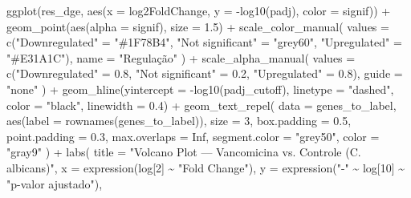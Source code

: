 \documentclass[
  letterpaper,
  DIV=11,
  numbers=noendperiod]{scrreprt}
\newenvironment{Shaded}{\begin{snugshade}}{\end{snugshade}}
\newcommand{\AttributeTok}[1]{\textcolor[rgb]{0.40,0.45,0.13}{#1}}
\newcommand{\ConstantTok}[1]{\textcolor[rgb]{0.56,0.35,0.01}{#1}}
\newcommand{\DecValTok}[1]{\textcolor[rgb]{0.68,0.00,0.00}{#1}}
\newcommand{\FloatTok}[1]{\textcolor[rgb]{0.68,0.00,0.00}{#1}}
\newcommand{\FunctionTok}[1]{\textcolor[rgb]{0.28,0.35,0.67}{#1}}
\newcommand{\NormalTok}[1]{\textcolor[rgb]{0.00,0.23,0.31}{#1}}
\newcommand{\OtherTok}[1]{\textcolor[rgb]{0.00,0.23,0.31}{#1}}
\newcommand{\SpecialCharTok}[1]{\textcolor[rgb]{0.37,0.37,0.37}{#1}}
\newcommand{\StringTok}[1]{\textcolor[rgb]{0.13,0.47,0.30}{#1}}
\begin{document}
\begin{Shaded}
\begin{Highlighting}[]
\FunctionTok{ggplot}\NormalTok{(res\_dge, }\FunctionTok{aes}\NormalTok{(}\AttributeTok{x =}\NormalTok{ log2FoldChange, }\AttributeTok{y =} \SpecialCharTok{{-}}\FunctionTok{log10}\NormalTok{(padj), }\AttributeTok{color =}\NormalTok{ signif)) }\SpecialCharTok{+}
  \FunctionTok{geom\_point}\NormalTok{(}\FunctionTok{aes}\NormalTok{(}\AttributeTok{alpha =}\NormalTok{ signif), }\AttributeTok{size =} \FloatTok{1.5}\NormalTok{) }\SpecialCharTok{+}
  \FunctionTok{scale\_color\_manual}\NormalTok{(}
    \AttributeTok{values =} \FunctionTok{c}\NormalTok{(}\StringTok{"Downregulated"} \OtherTok{=} \StringTok{"\#1F78B4"}\NormalTok{,}
               \StringTok{"Not significant"} \OtherTok{=} \StringTok{"grey60"}\NormalTok{,}
               \StringTok{"Upregulated"} \OtherTok{=} \StringTok{"\#E31A1C"}\NormalTok{),}
    \AttributeTok{name =} \StringTok{"Regulação"}
\NormalTok{  ) }\SpecialCharTok{+}
  \FunctionTok{scale\_alpha\_manual}\NormalTok{(}
    \AttributeTok{values =} \FunctionTok{c}\NormalTok{(}\StringTok{"Downregulated"} \OtherTok{=} \FloatTok{0.8}\NormalTok{,}
               \StringTok{"Not significant"} \OtherTok{=} \FloatTok{0.2}\NormalTok{,}
               \StringTok{"Upregulated"} \OtherTok{=} \FloatTok{0.8}\NormalTok{),}
    \AttributeTok{guide =} \StringTok{"none"}
\NormalTok{  ) }\SpecialCharTok{+}
  \FunctionTok{geom\_hline}\NormalTok{(}\AttributeTok{yintercept =} \SpecialCharTok{{-}}\FunctionTok{log10}\NormalTok{(padj\_cutoff),}
             \AttributeTok{linetype =} \StringTok{"dashed"}\NormalTok{, }\AttributeTok{color =} \StringTok{"black"}\NormalTok{, }\AttributeTok{linewidth =} \FloatTok{0.4}\NormalTok{) }\SpecialCharTok{+}
  \FunctionTok{geom\_text\_repel}\NormalTok{(}
    \AttributeTok{data =}\NormalTok{ genes\_to\_label,}
    \FunctionTok{aes}\NormalTok{(}\AttributeTok{label =} \FunctionTok{rownames}\NormalTok{(genes\_to\_label)),}
    \AttributeTok{size =} \DecValTok{3}\NormalTok{,}
    \AttributeTok{box.padding =} \FloatTok{0.5}\NormalTok{,}
    \AttributeTok{point.padding =} \FloatTok{0.3}\NormalTok{,}
    \AttributeTok{max.overlaps =} \ConstantTok{Inf}\NormalTok{,}
    \AttributeTok{segment.color =} \StringTok{"grey50"}\NormalTok{,}
    \AttributeTok{color =} \StringTok{"gray9"}
\NormalTok{  ) }\SpecialCharTok{+}
  \FunctionTok{labs}\NormalTok{(}
    \AttributeTok{title =} \StringTok{"Volcano Plot — Vancomicina vs. Controle (C. albicans)"}\NormalTok{,}
    \AttributeTok{x =} \FunctionTok{expression}\NormalTok{(log[}\DecValTok{2}\NormalTok{] }\SpecialCharTok{\textasciitilde{}} \StringTok{"Fold Change"}\NormalTok{),}
    \AttributeTok{y =} \FunctionTok{expression}\NormalTok{(}\StringTok{"{-}"} \SpecialCharTok{\textasciitilde{}}\NormalTok{ log[}\DecValTok{10}\NormalTok{] }\SpecialCharTok{\textasciitilde{}} \StringTok{"p{-}valor ajustado"}\NormalTok{),}

\end{Highlighting}
\end{Shaded}
\end{document}
